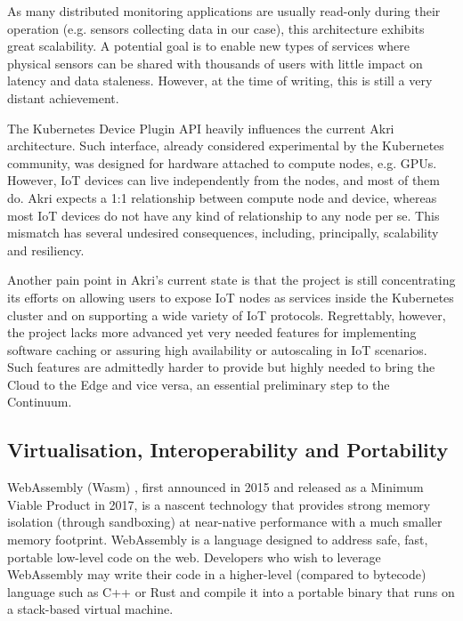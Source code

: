 As many distributed monitoring applications are usually read-only during their operation (e.g. sensors collecting data in our case), this architecture exhibits great scalability. A potential goal is to enable new types of services where physical sensors can be shared with thousands of users with little impact on latency and data staleness. However, at the time of writing, this is still a very distant achievement.

The Kubernetes Device Plugin API heavily influences the current Akri architecture. Such interface, already considered experimental by the Kubernetes community, was designed for hardware attached to compute nodes, e.g. GPUs. However, IoT devices can live independently from the nodes, and most of them do. Akri expects a 1:1 relationship between compute node and device, whereas most IoT devices do not have any kind of relationship to any node per se. This mismatch has several undesired consequences, including, principally, scalability and resiliency.

Another pain point in Akri's current state is that the project is still concentrating its efforts on allowing users to expose IoT nodes as services inside the Kubernetes cluster and on supporting a wide variety of IoT protocols. Regrettably, however, the project lacks more advanced yet very needed features for implementing software caching or assuring high availability or autoscaling in IoT scenarios. Such features are admittedly harder to provide but highly needed to bring the Cloud to the Edge and vice versa, an essential preliminary step to the Continuum.

\subsection{Virtualisation, Interoperability and Portability}\label{sec:virtualization}


WebAssembly (Wasm) \cite{haas2017bringing}, first announced in 2015 and released as a Minimum Viable Product in 2017, is a nascent technology that provides strong memory isolation (through sandboxing) at near-native performance with a much smaller memory footprint. WebAssembly is a language designed to address safe, fast, portable low-level code on the web. Developers who wish to leverage WebAssembly may write their code in a higher-level (compared to bytecode) language such as C++ or Rust and compile it into a portable binary that runs on a stack-based virtual machine.

